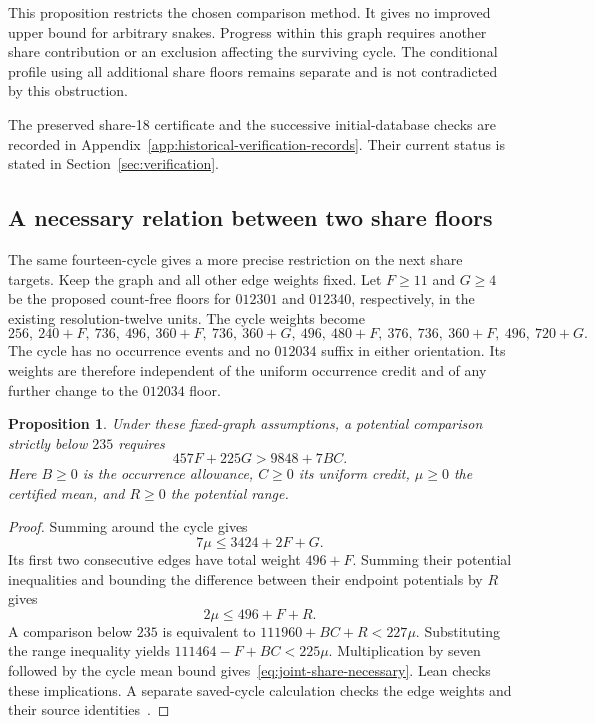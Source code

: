 \documentclass[11pt,a4paper]{article}
\newtheorem{proposition}[theorem]{Proposition}
\theoremstyle{definition}
\theoremstyle{remark}
\begin{document}
This proposition restricts the chosen comparison method. It gives no
improved upper bound for arbitrary snakes. Progress within this graph
requires another share contribution or an exclusion affecting the surviving
cycle. The conditional profile using all additional share floors remains
separate and is not contradicted by this obstruction.

The preserved share-18 certificate and the successive initial-database
checks are recorded in Appendix~\ref{app:historical-verification-records}.
Their current status is stated in Section~\ref{sec:verification}.

\subsection{A necessary relation between two share floors}\label{sec:joint-share-floors}
The same fourteen-cycle gives a more precise restriction on the next share
targets. Keep the graph and all other edge weights fixed. Let $F\ge11$ and
$G\ge4$ be the proposed count-free floors for $012301$ and $012340$,
respectively, in the existing resolution-twelve units. The cycle weights become
\[
256,\ 240+F,\ 736,\ 496,\ 360+F,\ 736,\ 360+G,\
496,\ 480+F,\ 376,\ 736,\ 360+F,\ 496,\ 720+G.
\]
The cycle has no occurrence events and no $012034$ suffix in either
orientation. Its weights are therefore independent of the uniform occurrence
credit and of any further change to the $012034$ floor.

\begin{proposition}\label{prop:joint-share-necessary}
Under these fixed-graph assumptions, a potential comparison strictly below
$235$ requires
\begin{equation}\label{eq:joint-share-necessary}
457F+225G>9848+7BC.
\end{equation}
Here $B\ge0$ is the occurrence allowance, $C\ge0$ its uniform credit,
$\mu\ge0$ the certified mean, and $R\ge0$ the potential range.
\end{proposition}
\begin{proof}
Summing around the cycle gives
\[
7\mu\le3424+2F+G.
\]
Its first two consecutive edges have total weight $496+F$.
Summing their potential inequalities and bounding the difference between
their endpoint potentials by $R$ gives
\[
2\mu\le496+F+R.
\]
A comparison below $235$ is equivalent to
$111960+BC+R<227\mu$. Substituting the range inequality yields
$111464-F+BC<225\mu$. Multiplication by seven followed by the cycle
mean bound gives~\eqref{eq:joint-share-necessary}. Lean checks these
implications. A separate saved-cycle calculation checks the edge weights
and their source identities~\cite{share145archive}.
\end{proof}
\end{document}
